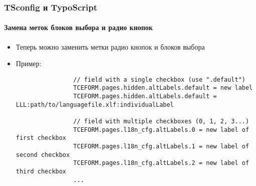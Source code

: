
\begin{frame}[fragile]
	\frametitle{TSconfig и TypoScript}
	\framesubtitle{Замена меток блоков выбора и радио кнопок}

	\lstset{basicstyle=\tiny\ttfamily}

	\begin{itemize}

		\item Теперь можно заменить метки радио кнопок и блоков выбора
		\item Пример:

			\begin{lstlisting}
				// field with a single checkbox (use ".default")
				TCEFORM.pages.hidden.altLabels.default = new label
				TCEFORM.pages.hidden.altLabels.default = LLL:path/to/languagefile.xlf:individualLabel

				// field with multiple checkboxes (0, 1, 2, 3...)
				TCEFORM.pages.l18n_cfg.altLabels.0 = new label of first checkbox
				TCEFORM.pages.l18n_cfg.altLabels.1 = new label of second checkbox
				TCEFORM.pages.l18n_cfg.altLabels.2 = new label of third checkbox
				...
			\end{lstlisting}

	\end{itemize}

\end{frame}



